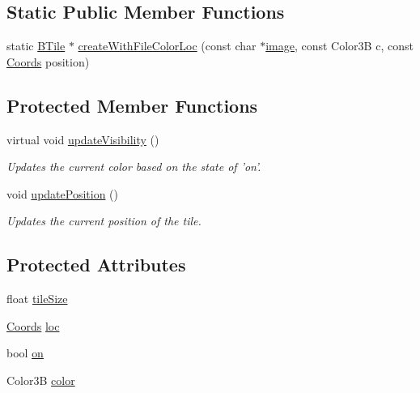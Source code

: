 \subsection*{\-Static \-Public \-Member \-Functions}
\begin{DoxyCompactItemize}
\item 
static \hyperlink{class_b_tile}{\-B\-Tile} $\ast$ \hyperlink{class_b_tile_a66fcbdd086a6a5d51ca07545d41f7f73}{create\-With\-File\-Color\-Loc} (const char $\ast$\hyperlink{_game_list_8h_ac745ab21f82aa96829863dcfc37ef5a8}{image}, const \-Color3\-B c, const \hyperlink{struct_coords}{\-Coords} position)
\end{DoxyCompactItemize}
\subsection*{\-Protected \-Member \-Functions}
\begin{DoxyCompactItemize}
\item 
virtual void \hyperlink{class_b_tile_a918487991f9b721438231c5a1ed0140f}{update\-Visibility} ()
\begin{DoxyCompactList}\small\item\em \-Updates the current color based on the state of 'on'. \end{DoxyCompactList}\item 
void \hyperlink{class_b_tile_ae6faeef28449999ac4f1b2938fd2e89c}{update\-Position} ()
\begin{DoxyCompactList}\small\item\em \-Updates the current position of the tile. \end{DoxyCompactList}\end{DoxyCompactItemize}
\subsection*{\-Protected \-Attributes}
\begin{DoxyCompactItemize}
\item 
float \hyperlink{class_b_tile_a0c85a54373837c9bbe0fa2f83475234b}{tile\-Size}
\item 
\hyperlink{struct_coords}{\-Coords} \hyperlink{class_b_tile_a9a106634c3890eaa7a69cddc9680d822}{loc}
\item 
bool \hyperlink{class_b_tile_a793fe978c4d34fc611dbe7d21079610d}{on}
\item 
\-Color3\-B \hyperlink{class_b_tile_a24df3d28185701700b2fd217641775f6}{color}
\end{DoxyCompactItemize}


